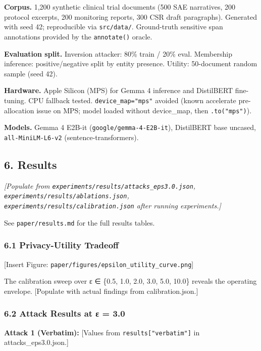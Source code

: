 \textbf{Corpus.} 1,200 synthetic clinical trial documents (500 SAE
narratives, 200 protocol excerpts, 200 monitoring reports, 300 CSR draft
paragraphs). Generated with seed 42; reproducible via
\texttt{src/data/}. Ground-truth sensitive span annotations provided by
the \texttt{annotate()} oracle.

\textbf{Evaluation split.} Inversion attacker: 80\% train / 20\% eval.
Membership inference: positive/negative split by entity presence.
Utility: 50-document random sample (seed 42).

\textbf{Hardware.} Apple Silicon (MPS) for Gemma 4 inference and
DistilBERT fine-tuning. CPU fallback tested. \texttt{device\_map="mps"}
avoided (known accelerate pre-allocation issue on MPS; model loaded
without device\_map, then \texttt{.to("mps")}).

\textbf{Models.} Gemma 4 E2B-it (\texttt{google/gemma-4-E2B-it}),
DistilBERT base uncased, \texttt{all-MiniLM-L6-v2}
(sentence-transformers).

\subsection{6. Results}\label{results}

\emph{{[}Populate from
\texttt{experiments/results/attacks\_eps3.0.json},
\texttt{experiments/results/ablations.json},
\texttt{experiments/results/calibration.json} after running
experiments.{]}}

See \texttt{paper/results.md} for the full results tables.

\subsubsection{6.1 Privacy-Utility
Tradeoff}\label{privacy-utility-tradeoff}

{[}Insert Figure: \texttt{paper/figures/epsilon\_utility\_curve.png}{]}

The calibration sweep over ε ∈ \{0.5, 1.0, 2.0, 3.0, 5.0, 10.0\} reveals
the operating envelope. {[}Populate with actual findings from
calibration.json.{]}

\subsubsection{6.2 Attack Results at ε =
3.0}\label{attack-results-at-ux3b5-3.0}

\textbf{Attack 1 (Verbatim):} {[}Values from
\texttt{results{[}"verbatim"{]}} in attacks\_eps3.0.json.{]}

